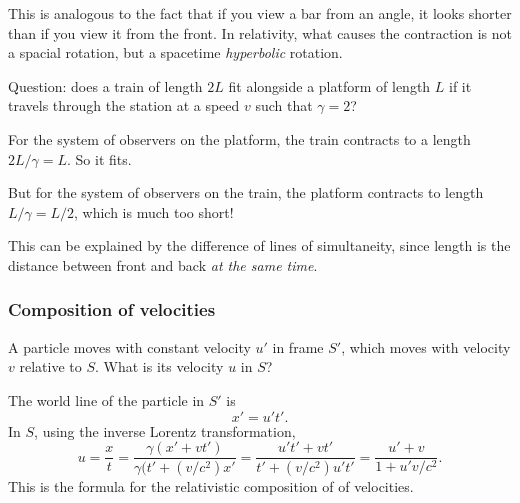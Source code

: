 \documentclass[a4paper]{article}
\begin{document}
This is analogous to the fact that if you view a bar from an angle, it looks shorter than if you view it from the front. In relativity, what causes the contraction is not a spacial rotation, but a spacetime \emph{hyperbolic} rotation.

Question: does a train of length $2L$ fit alongside a platform of length $L$ if it travels through the station at a speed $v$ such that $\gamma = 2$?

For the system of observers on the platform, the train contracts to a length $2L/\gamma = L$. So it fits.

But for the system of observers on the train, the platform contracts to length $L/\gamma = L/2$, which is much too short!

This can be explained by the difference of lines of simultaneity, since length is the distance between front and back \emph{at the same time}.
\begin{center}
\end{center}

\subsubsection*{Composition of velocities}
A particle moves with constant velocity $u'$ in frame $S'$, which moves with velocity $v$ relative to $S$. What is its velocity $u$ in $S$?

The world line of the particle in $S'$ is
\[
  x' = u't'.
\]
In $S$, using the inverse Lorentz transformation,
\[
  u = \frac{x}{t} = \frac{\gamma(x' + vt')}{\gamma(t' + (v/c^2) x'} = \frac{u't' + vt'}{t' + (v/c^2)u't'} = \frac{u' + v}{1 + u'v/c^2}.
\]
This is the formula for the relativistic composition of of velocities.
\end{document}
